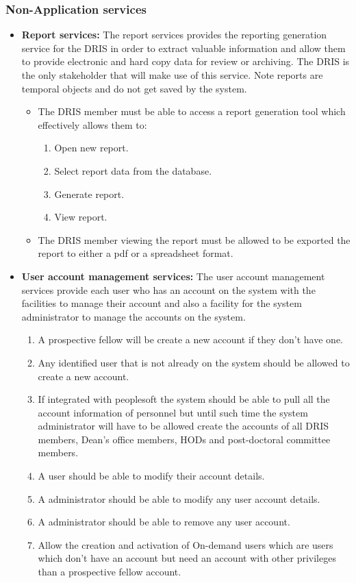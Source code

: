 \documentclass[12pt]{article}
\begin{document}
\subsubsection{Non-Application services}
	\begin{itemize}
		\item\textbf{Report services:}
		The report services provides the reporting generation service for the DRIS in order to extract valuable information and allow them to provide electronic and hard copy data for review or archiving. The DRIS is the only stakeholder that will make use of this service. Note reports are temporal objects and do not get saved by the system.
		\begin{itemize}
			\item The DRIS member must be able to access a report generation tool which effectively allows them to:
			\begin{enumerate}
				\item Open new report.
				\item Select report data from the database.
				\item Generate report.
				\item View report.
			\end{enumerate}
			\item The DRIS member viewing the report must be allowed to be exported the report to either a pdf or a spreadsheet format.	
		\end{itemize}

		\item\textbf{User account management services:}
		The user account management services provide each user who has an account on the system with the facilities to manage their account and also a facility for the system administrator to manage the accounts on the system.
		\begin{enumerate}
			\item A prospective fellow will be create a new account if they don't have one.
			\item Any identified user that is not already on the system should be allowed to create a new account.
			\item If integrated with peoplesoft the system should be able to pull all the account information of personnel but until such time the system administrator will have to be allowed create the accounts of all DRIS members, Dean's office members, HODs and post-doctoral committee members.	
			\item A user should be able to modify their account details.
			\item A administrator should be able to modify any user account details.
			\item A administrator should be able to remove any user account.
			\item Allow the creation and activation of On-demand users which are users which don't have an account but need an account with other privileges than a prospective fellow account.
		\end{enumerate}
	

\end{itemize}
\end{document}
